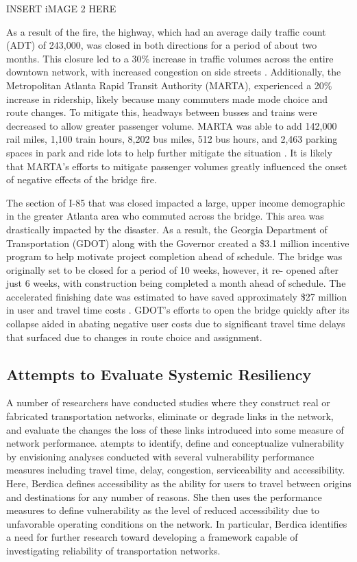 INSERT iMAGE 2 HERE

As a result of the fire, the highway, which had an average daily traffic
count (ADT) of 243,000,
was closed in both directions for a period of about two months. This
closure led to a 30\%
increase in traffic volumes across the entire downtown network, with
increased congestion on side
streets \cite{hamedi2018}. Additionally, the Metropolitan Atlanta Rapid
Transit Authority
(MARTA), experienced a 20\% increase in ridership, likely because many
commuters made mode choice
and route changes. To mitigate this, headways between busses and trains
were decreased to allow
greater passenger volume. MARTA was able to add 142,000 rail miles, 1,100
train hours, 8,202 bus
miles, 512 bus hours, and 2,463 parking spaces in park and ride lots to
help further mitigate the
situation \cite{marta2017, marta2018}. It is likely that MARTA’s efforts
to mitigate passenger
volumes greatly influenced the onset of negative effects of the bridge
fire.

The section of I-85 that was closed impacted a large, upper income
demographic in the greater
Atlanta area who commuted across the bridge. This area was drastically
impacted by the disaster.
As a result, the Georgia Department of Transportation (GDOT) along with
the Governor created a
\$3.1 million incentive program to help motivate project completion ahead
of schedule. The bridge
was originally set to be closed for a period of 10 weeks, however, it re-
opened after just 6
weeks, with construction being completed a month ahead of schedule. The
accelerated finishing
date was estimated to have saved approximately \$27 million in user and
travel time costs
\cite{GDOT2017}. GDOT’s efforts to open the bridge quickly after its
collapse aided in abating negative user costs due to significant travel
time delays that surfaced
due to changes in route choice and assignment.

\subsection{Attempts to Evaluate Systemic Resiliency}

A number of researchers have conducted studies where they construct real
or fabricated
transportation networks, eliminate or degrade links in the network, and
evaluate the changes the
loss of these links introduced into some measure of network performance.
\cite{berdica2002}
atempts
to identify, define and conceptualize vulnerability by envisioning
analyses conducted with
several vulnerability performance measures including travel time, delay,
congestion,
serviceability and accessibility. Here, Berdica defines accessibility as
the ability for users to
travel between origins and destinations for any number of reasons. She
then uses the performance
measures to define vulnerability as the level of reduced accessibility due
to unfavorable
operating conditions on the network. In particular, Berdica identifies a
need for further
research toward developing a framework capable of investigating
reliability of transportation
networks.

